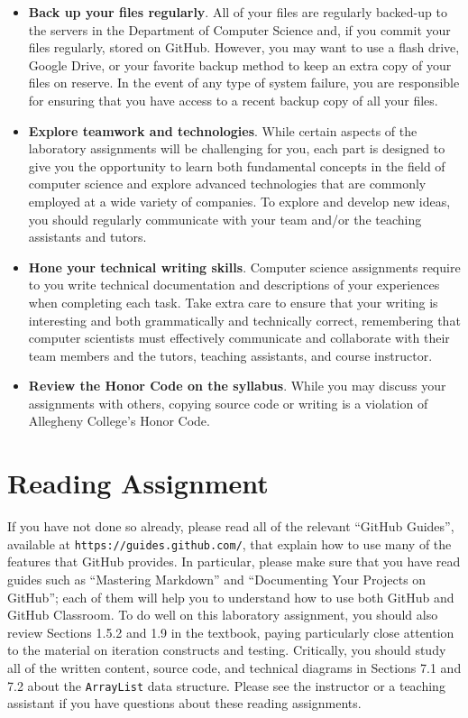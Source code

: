 \documentclass[11pt]{article}
\newcommand{\program}[1]{\lstinline{#1}}
\newcommand{\url}[1]{\lstinline{#1}}
\begin{document}
\begin{itemize}
\item {\bf Back up your files regularly}. All of your files are regularly backed-up to the servers in the Department of
  Computer Science and, if you commit your files regularly, stored on GitHub. However, you may want to use a flash
  drive, Google Drive, or your favorite backup method to keep an extra copy of your files on reserve. In the event of
  any type of system failure, you are responsible for ensuring that you have access to a recent backup copy of all your
  files.

\item {\bf Explore teamwork and technologies}. While certain aspects of the laboratory assignments will be challenging
  for you, each part is designed to give you the opportunity to learn both fundamental concepts in the field of computer
  science and explore advanced technologies that are commonly employed at a wide variety of companies. To explore and
  develop new ideas, you should regularly communicate with your team and/or the teaching assistants and tutors.

\item {\bf Hone your technical writing skills}. Computer science assignments require to you write technical
  documentation and descriptions of your experiences when completing each task. Take extra care to ensure that your
  writing is interesting and both grammatically and technically correct, remembering that computer scientists must
  effectively communicate and collaborate with their team members and the tutors, teaching assistants, and course
  instructor.

\item {\bf Review the Honor Code on the syllabus}. While you may discuss your assignments with others, copying source
  code or writing is a violation of Allegheny College's Honor Code.

\end{itemize}

\section*{Reading Assignment}

If you have not done so already, please read all of the relevant ``GitHub
Guides'', available at \url{https://guides.github.com/}, that explain how to use
many of the features that GitHub provides. In particular, please make sure that
you have read guides such as ``Mastering Markdown'' and ``Documenting Your
Projects on GitHub''; each of them will help you to understand how to use both
GitHub and GitHub Classroom. To do well on this laboratory assignment, you
should also review Sections 1.5.2 and 1.9 in the textbook, paying particularly
close attention to the material on iteration constructs and testing. Critically,
you should study all of the written content, source code, and technical diagrams
in Sections 7.1 and 7.2 about the \program{ArrayList} data structure. Please see
the instructor or a teaching assistant if you have questions about these reading
assignments.
\end{document}
